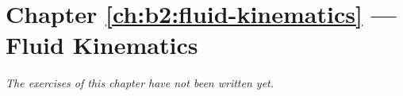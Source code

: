 \section*{Chapter \ref{ch:b2:fluid-kinematics} --- Fluid Kinematics}


\emph{The exercises of this chapter have not been written yet.}
